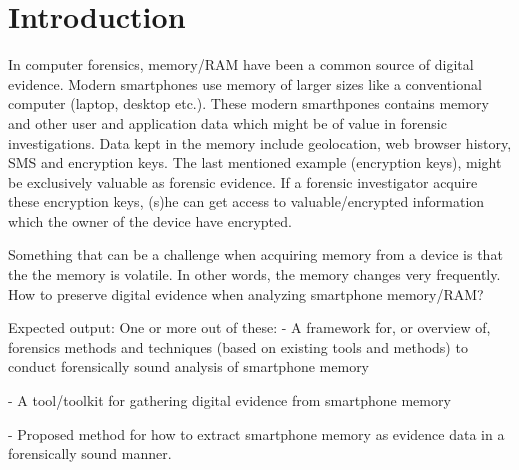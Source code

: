 \section{Introduction}
In computer forensics, memory/RAM have been a common source of digital evidence. 
Modern smartphones use memory of larger sizes like a conventional computer (laptop, desktop etc.).
These modern smarthpones contains memory and other user and application  data which
might be of value in forensic investigations.
Data kept in the memory include geolocation, web browser history, SMS and encryption keys.
The last mentioned example (encryption keys), might be exclusively valuable as forensic evidence.
If a forensic investigator acquire these encryption keys, (s)he can get access to valuable/encrypted
information which the owner of the device have encrypted.

Something that can be a challenge when acquiring memory from a device is that the the memory is volatile.
In other words, the memory changes very frequently. 
How to preserve digital evidence when analyzing smartphone memory/RAM?

Expected output:
One or more out of these:
    - A framework for, or overview of, forensics methods and techniques (based 
    on existing tools and methods) to conduct forensically sound analysis of 
    smartphone memory

    - A tool/toolkit for gathering digital evidence from smartphone memory

    - Proposed method for how to extract smartphone memory as evidence data in 
      a forensically sound manner.

